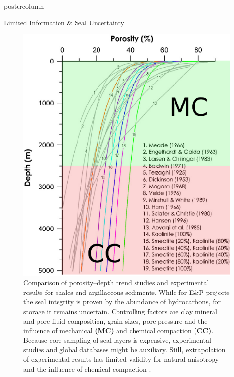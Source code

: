 \documentclass{beamer}
\begin{document}
\begin{frame}
\begin{columns}
\begin{column}{.618\textwidth}
\begin{beamercolorbox}[center]{postercolumn}
\begin{minipage}{.98\textwidth}
{\begin{myblock}{Limited Information \& Seal Uncertainty}
\vspace{0.3em}
\begin{figure}
	\begin{minipage}{0.95\textwidth}
		\begin{minipage}[t]{0.36\textwidth}
			\vspace{0pt}
			\includegraphics[width=\textwidth]{figures/compaction.pdf}
		\end{minipage}\hfill
		\begin{minipage}[t]{0.22\textwidth}
			\vspace{0pt}
			\caption{
			Comparison of porosity–depth trend studies and experimental results for shales and
argillaceous sediments. While for E\&P projects the seal integrity is proven by the abundance of hydrocarbons, for  storage it remains uncertain. Controlling factors are clay mineral and pore fluid composition, grain sizes, pore pressure and the influence of mechanical \textbf{(MC)} and chemical compaction \textbf{(CC)}. Because core sampling of seal layers is expensive, experimental studies and global databases might be auxiliary. Still, extrapolation of experimental results has limited validity for natural anisotropy and the influence of chemical compaction \citep{mondol_experimental_2007}.
}
\end{minipage}
\end{minipage}
\end{figure}
\end{myblock}}
\end{minipage}
\end{beamercolorbox}
\end{column}
\end{columns}
\end{frame}
\end{document}
